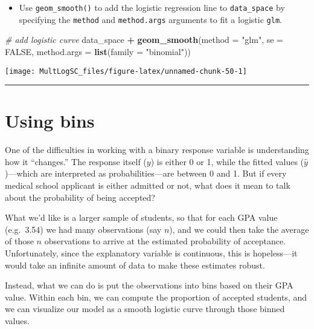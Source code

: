\documentclass[
]{book}
\newenvironment{Shaded}{\begin{snugshade}}{\end{snugshade}}
\newcommand{\CommentTok}[1]{\textcolor[rgb]{0.56,0.35,0.01}{\textit{#1}}}
\newcommand{\DataTypeTok}[1]{\textcolor[rgb]{0.13,0.29,0.53}{#1}}
\newcommand{\KeywordTok}[1]{\textcolor[rgb]{0.13,0.29,0.53}{\textbf{#1}}}
\newcommand{\NormalTok}[1]{#1}
\newcommand{\OperatorTok}[1]{\textcolor[rgb]{0.81,0.36,0.00}{\textbf{#1}}}
\newcommand{\OtherTok}[1]{\textcolor[rgb]{0.56,0.35,0.01}{#1}}
\newcommand{\StringTok}[1]{\textcolor[rgb]{0.31,0.60,0.02}{#1}}
\providecommand{\tightlist}{%
  \setlength{\itemsep}{0pt}\setlength{\parskip}{0pt}}
\begin{document}
\begin{itemize}
\tightlist
\item
  Use \texttt{geom\_smooth()} to add the logistic regression line to \texttt{data\_space} by specifying the \texttt{method} and \texttt{method.args} arguments to fit a logistic \texttt{glm}.
\end{itemize}

\begin{Shaded}
\begin{Highlighting}[]
\CommentTok{# add logistic curve}
\NormalTok{data_space }\OperatorTok{+}
\StringTok{  }\KeywordTok{geom_smooth}\NormalTok{(}\DataTypeTok{method =} \StringTok{"glm"}\NormalTok{, }\DataTypeTok{se =} \OtherTok{FALSE}\NormalTok{, }\DataTypeTok{method.args =} \KeywordTok{list}\NormalTok{(}\DataTypeTok{family =} \StringTok{"binomial"}\NormalTok{))}
\end{Highlighting}
\end{Shaded}

\begin{center}\texttt{[image: MultLogSC\_files/figure-latex/unnamed-chunk-50-1]} \end{center}

\begin{center}\rule{0.5\linewidth}{0.5pt}\end{center}

\hypertarget{using-bins}{%
\section{Using bins}\label{using-bins}}

One of the difficulties in working with a binary response variable is understanding how it ``changes.'' The response itself (\(y\)) is either 0 or 1, while the fitted values (\(\hat{y}\))---which are interpreted as probabilities---are between 0 and 1. But if every medical school applicant is either admitted or not, what does it mean to talk about the probability of being accepted?

What we'd like is a larger sample of students, so that for each GPA value (e.g.~3.54) we had many observations (say \(n\)), and we could then take the average of those \(n\) observations to arrive at the estimated probability of acceptance. Unfortunately, since the explanatory variable is continuous, this is hopeless---it would take an infinite amount of data to make these estimates robust.

Instead, what we can do is put the observations into bins based on their GPA value. Within each bin, we can compute the proportion of accepted students, and we can visualize our model as a smooth logistic curve through those binned values.
\end{document}
